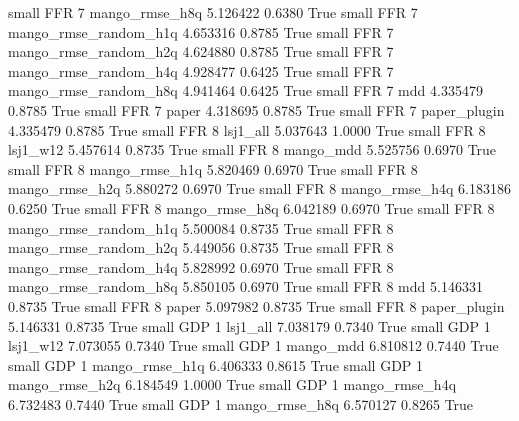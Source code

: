      small      FFR                 7        mango_rmse_h8q   5.126422      0.6380    True
     small      FFR                 7 mango_rmse_random_h1q   4.653316      0.8785    True
     small      FFR                 7 mango_rmse_random_h2q   4.624880      0.8785    True
     small      FFR                 7 mango_rmse_random_h4q   4.928477      0.6425    True
     small      FFR                 7 mango_rmse_random_h8q   4.941464      0.6425    True
     small      FFR                 7                   mdd   4.335479      0.8785    True
     small      FFR                 7                 paper   4.318695      0.8785    True
     small      FFR                 7          paper_plugin   4.335479      0.8785    True
     small      FFR                 8              lsj1_all   5.037643      1.0000    True
     small      FFR                 8              lsj1_w12   5.457614      0.8735    True
     small      FFR                 8             mango_mdd   5.525756      0.6970    True
     small      FFR                 8        mango_rmse_h1q   5.820469      0.6970    True
     small      FFR                 8        mango_rmse_h2q   5.880272      0.6970    True
     small      FFR                 8        mango_rmse_h4q   6.183186      0.6250    True
     small      FFR                 8        mango_rmse_h8q   6.042189      0.6970    True
     small      FFR                 8 mango_rmse_random_h1q   5.500084      0.8735    True
     small      FFR                 8 mango_rmse_random_h2q   5.449056      0.8735    True
     small      FFR                 8 mango_rmse_random_h4q   5.828992      0.6970    True
     small      FFR                 8 mango_rmse_random_h8q   5.850105      0.6970    True
     small      FFR                 8                   mdd   5.146331      0.8735    True
     small      FFR                 8                 paper   5.097982      0.8735    True
     small      FFR                 8          paper_plugin   5.146331      0.8735    True
     small      GDP                 1              lsj1_all   7.038179      0.7340    True
     small      GDP                 1              lsj1_w12   7.073055      0.7340    True
     small      GDP                 1             mango_mdd   6.810812      0.7440    True
     small      GDP                 1        mango_rmse_h1q   6.406333      0.8615    True
     small      GDP                 1        mango_rmse_h2q   6.184549      1.0000    True
     small      GDP                 1        mango_rmse_h4q   6.732483      0.7440    True
     small      GDP                 1        mango_rmse_h8q   6.570127      0.8265    True
